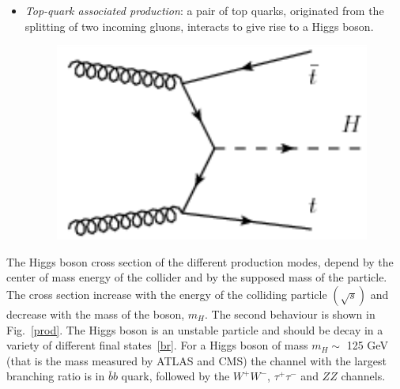 \begin{itemize}
\begin{figure}[h]
\end{figure}
\item \textit{Top-quark associated production}: a pair of top quarks, originated from
the splitting of two incoming gluons, interacts to give rise to a Higgs boson. 
 \begin{figure}[!htbp]
\centering
\vspace{0.5cm}
\includegraphics[scale= 0.6]{../Cap1/tt}
\end{figure}  
\end{itemize}
The Higgs boson cross section of the different production modes, depend by the center of mass energy of the collider and by the supposed mass of the particle.
The cross section increase with the energy of the colliding particle $(\sqrt{s})$ and decrease with the mass of the boson, $m_H$. The second behaviour is shown in
Fig.~\ref{prod}. The Higgs boson is an unstable particle and should be decay in a variety of different final states~\ref{br}. For a Higgs boson of mass $m_H \sim$ 125 GeV (that is the mass measured by ATLAS and CMS) the channel with the largest branching ratio is in $\bar{b}b$ quark, followed by the $W^+W^-$, $\tau^+ \tau^-$ and $ZZ$ channels.

